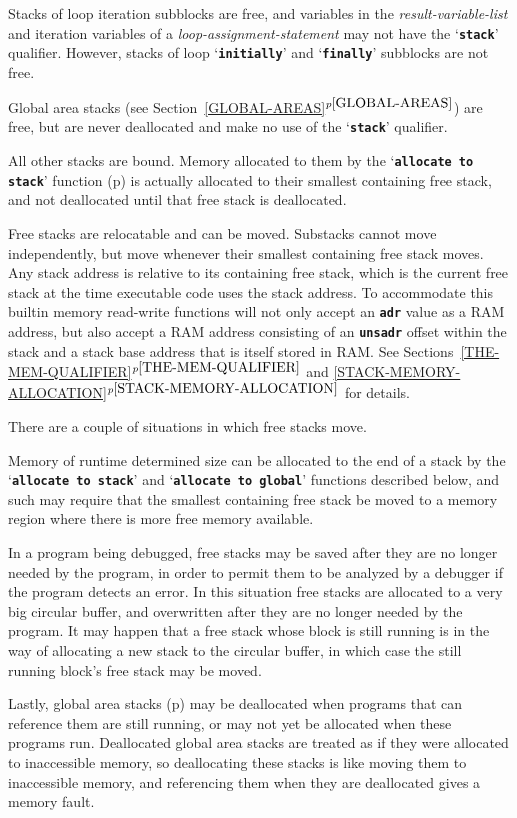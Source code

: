 \documentclass[12pt]{article}
\newcommand{\TT}[1]{{\tt \bfseries #1}}
\newcommand{\itemref}[1]{\ref{#1}$^{p\pageref{#1}}$}
\newcommand{\pagref}[1]{p\pageref{#1}}
\begin{document}
Stacks of loop iteration subblocks are free, and
variables in the {\em result-variable-list}
and iteration variables
of a {\em loop-assignment-statement} may not have the `\TT{stack}'
qualifier.  However, stacks of loop `\TT{initially}' and `\TT{finally}'
subblocks are not free.

Global area stacks (see Section~\itemref{GLOBAL-AREAS}) are free,
but are never deallocated and make no use of the `\TT{stack}'
qualifier.

All other stacks are bound.  Memory allocated to them
by the `\TT{allocate to stack}' function (\pagref{ALLOCATE-TO-STACK})
is actually
allocated to their smallest containing free stack, and not deallocated
until that free stack is deallocated.

Free stacks are relocatable and can be moved.
Substacks cannot move independently,
but move whenever their smallest containing free stack moves.
Any stack address is relative to its containing free stack,
which is the current free stack at the time executable code uses
the stack address.  To accommodate this builtin memory read-write
functions will not only accept an \TT{adr} value as a RAM address,
but also accept a RAM address consisting of an \TT{unsadr}
offset within the stack and a stack base address that is itself
stored in RAM.  See Sections~\itemref{THE-MEM-QUALIFIER}
and \itemref{STACK-MEMORY-ALLOCATION}
for details.

There are a couple of situations in which free stacks move.

Memory of runtime determined size can be allocated to the end of
a stack by the `\TT{allocate to stack}' and `\TT{allocate to global}'
functions described below, and such may
require that the smallest containing free stack
be moved to a memory region where there is more free memory available.

In a program being debugged, free stacks may be saved after they are no
longer needed by the program, in order to permit them to be analyzed
by a debugger if the program detects an error.  In this situation
free stacks are allocated to a very big circular buffer, and overwritten
after they are no longer needed by the program.  It may happen that
a free stack whose block is still running is in the way of allocating
a new stack to the circular buffer, in which case the still running
block's free stack may be moved.

Lastly, global area stacks (\pagref{GLOBAL-AREAS})
may be deallocated when programs that
can reference them are still running, or may not yet be allocated
when these programs run.  Deallocated global area stacks are treated as if
they were allocated to inaccessible memory, so deallocating these stacks
is like moving them to inaccessible memory, and referencing
them when they are deallocated gives a memory fault.
\end{document}

